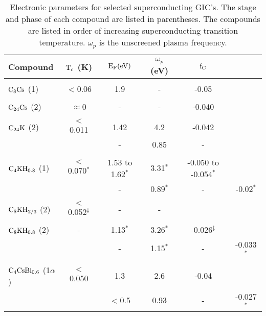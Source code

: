 

%
\setcounter{page}{243}
\setcounter{table}{6.1}
\begin{table}
\caption[Electronic parameters of the superconducting GIC's.]{Electronic 
parameters for selected superconducting GIC's.  The stage and phase of each
compound are listed in parentheses.  The  compounds are listed  in order of
increasing  superconducting  transition  temperature.  $\omega_p$  is   the
unscreened plasma frequency.}
\label{electronicparams}
\begin{center}
\begin{tabular}{|lc|cccc|}
\hline
Compound  & $\rm T_c$ (K) & $\rm E_F (eV)$ &  $\omega_p$ (eV) & $\rm f_C$ \\
\hline\\
$\rm C_8Cs$ (1) & $<$0.06\cite{tanuma81} & 1.9\cite{lagues84}&-& -0.05\cite{takahashi86,dicenzo86}\\
& & & & \\
$\rm C_{24}Cs$ (2) & $\approx$0 &-&-& -0.040\cite{fretigny85}\\
& & & & \\
$\rm C_{24}K$ (2) & $<$0.011\cite{koike80} & 1.42\cite{doll87} & 4.2\cite{doll87} & -0.042\cite{doll87,I63,preil84}\\
& &-& 0.85\cite{preil84,preil83} &-& \\
& & & & \\
$\rm C_4KH_{0.8}$  (1) & $<$0.070$^{\ast}$\cite{suzuki85b} &
1.53 to 1.62$^{\ast}$\cite{doll87} & 3.31$^{\ast}$\cite{doll87} & -0.050 to -0.054$^{\ast}$\cite{doll87}\\
& &-& 0.89$^{\ast}$\cite{O353} & - & -0.02$^{\ast}$\cite{Z260}\\
& & & & \\
$\rm C_8KH_{2/3}$ (2) & $<$0.052$^{\ddag}$\cite{sano80} & - & -  \\
& & & & \\
$\rm C_8KH_{0.8}$ (2) & - & 1.13$^{\ast}$\cite{doll87} & 3.26$^{\ast}$\cite{doll87} & -0.026$^{\ddag}$\cite{doll87} \\
& &-& 1.15$^{\ast}$\cite{Z260} &-& -0.033$^{\ast}$\cite{Z260}\\
& & & & \\
$\rm C_4CsBi_{0.6}$ (1$\alpha$) & $<$0.050\cite{stang88} & 1.3\cite{yang88} & 2.6\cite{yang88} & -0.04\cite{yang88}\\
& & $<$0.5\cite{E291} & 0.93\cite{E291} &-& -0.027$^*$\\

\end{tabular}
\end{center}
\end{table}
